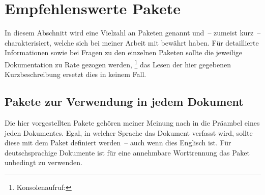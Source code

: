 \documentclass[%
  english,ngerman,%
  headings=optiontoheadandtoc,captions=tableheading,numbers=noenddot,%
  chapterpage,cdfoot,%
]{tudscrman}
\begin{document}
\section{Empfehlenswerte Pakete}
\label{sec:packages:recommended}
In diesem Abschnitt wird eine Vielzahl an Paketen genannt und~-- zumeist kurz~-- 
charakterisiert, welche sich bei meiner Arbeit mit  bewährt haben.
Für detaillierte Informationen sowie bei Fragen zu den einzelnen Paketen sollte 
die jeweilige Dokumentation zu Rate gezogen werden,%
\footnote{Konsolenaufruf: }
das Lesen der hier gegebenen Kurzbeschreibung ersetzt dies in keinem Fall.
\subsection{Pakete zur Verwendung in jedem Dokument}
Die hier vorgestellten Pakete gehören meiner Meinung nach in die Präambel eines 
jeden Dokumentes. Egal, in welcher Sprache das Dokument verfasst wird, sollte 
diese mit dem Paket  definiert werden~-- auch wenn dies Englisch 
ist. Für deutschsprachige Dokumente ist für eine annehmbare Worttrennung das 
Paket  unbedingt zu verwenden.
\end{document}
